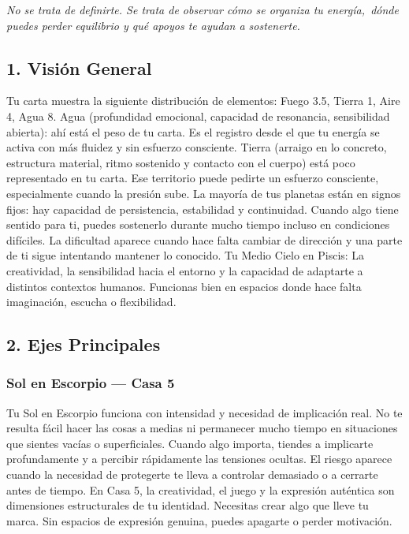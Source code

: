 \documentclass[11pt,a4paper]{article}\usepackage[utf8]{inputenc}
\begin{document}
\begin{center}
{\small\itshape
No se trata de definirte. Se trata de observar cómo se organiza tu energía,\
dónde puedes perder equilibrio y qué apoyos te ayudan a sostenerte.
}
\end{center}

\vspace{0.5cm}

\subsection{1. Visión General}

Tu carta muestra la siguiente distribución de elementos: Fuego 3.5, Tierra 1, Aire 4, Agua 8. Agua (profundidad emocional, capacidad de resonancia, sensibilidad abierta): ahí está el peso de tu carta. Es el registro desde el que tu energía se activa con más fluidez y sin esfuerzo consciente. Tierra (arraigo en lo concreto, estructura material, ritmo sostenido y contacto con el cuerpo) está poco representado en tu carta. Ese territorio puede pedirte un esfuerzo consciente, especialmente cuando la presión sube. La mayoría de tus planetas están en signos fijos: hay capacidad de persistencia, estabilidad y continuidad. Cuando algo tiene sentido para ti, puedes sostenerlo durante mucho tiempo incluso en condiciones difíciles. La dificultad aparece cuando hace falta cambiar de dirección y una parte de ti sigue intentando mantener lo conocido. Tu Medio Cielo en Piscis: La creatividad, la sensibilidad hacia el entorno y la capacidad de adaptarte a distintos contextos humanos. Funcionas bien en espacios donde hace falta imaginación, escucha o flexibilidad.

\vspace{0.8cm}

\subsection{2. Ejes Principales}

\subsubsection*{Sol en Escorpio — Casa 5}
Tu Sol en Escorpio funciona con intensidad y necesidad de implicación real. No te resulta fácil hacer las cosas a medias ni permanecer mucho tiempo en situaciones que sientes vacías o superficiales. Cuando algo importa, tiendes a implicarte profundamente y a percibir rápidamente las tensiones ocultas. El riesgo aparece cuando la necesidad de protegerte te lleva a controlar demasiado o a cerrarte antes de tiempo. En Casa 5, la creatividad, el juego y la expresión auténtica son dimensiones estructurales de tu identidad. Necesitas crear algo que lleve tu marca. Sin espacios de expresión genuina, puedes apagarte o perder motivación.
\end{document}
